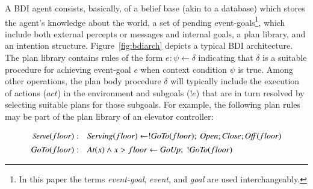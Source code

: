 A BDI agent consists, basically, of a belief base (akin to a database) which
stores the agent's knowledge about the world, a set of pending
event-goals\footnote{In this paper the terms {\em event-goal}, {\em event}, and
{\em goal} are used interchangeably.}, which include both external percepts or
messages and internal goals, a plan library, and an intention structure.
Figure~\ref{fig:bdiarch} depicts a typical BDI architecture.
The plan library contains rules of the form $e: \psi \leftarrow \delta$
indicating that $\delta$ is a suitable procedure for achieving event-goal $e$
when context condition $\psi$ is true.
Among other operations, the plan body procedure $\delta$ will typically include
the execution of actions ($act$) in the environment and subgoals ($!e$) that are
in turn resolved by selecting suitable plans for those subgoals.
For example, the following plan rules may be part of the plan library of an
elevator controller:
\newcommand{\mathname}[1]{\mbox{\textit{#1}}}

\newcommand{\eSolve}{\textmath{Solve}}
\newcommand{\aMove}{\textmath{move}}
\newcommand{\pOn}{\textmath{on}}
\newcommand{\pPin}{\textmath{pin}}

\newcommand{\eServeAll}{\textmath{ServeAll}}
\newcommand{\eServeFloor}{\textmath{Serve}}
\newcommand{\eGoTo}{\textmath{GoTo}}

\newcommand{\pServing}{\textmath{Serving}}
\newcommand{\pAt}{\textmath{At}}

\newcommand{\aUp}{\textmath{GoUp}}
\newcommand{\aOpen}{\textmath{Open}}
\newcommand{\aClose}{\textmath{Close}}
\newcommand{\aOff}{\textmath{Off}}

\[
\begin{array}{rl}\small
\eServeFloor(floor)  : &  \pServing(floor) \leftarrow 
	!\eGoTo(floor);\ \aOpen; \aClose; \aOff(floor) \\[1ex] 
\eGoTo(floor)  : & \pAt(x) \land x>floor \leftarrow \aUp;\ !\eGoTo(floor)
\end{array}
\]

